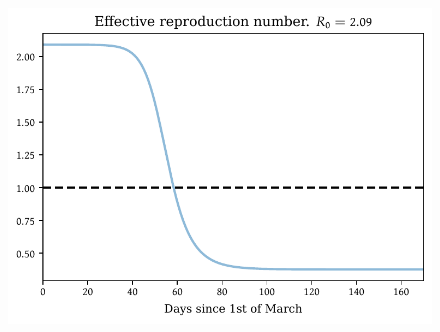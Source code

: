 \documentclass[a4paper,11pt]{article}
\theoremstyle{definition}
\theoremstyle{plain}
\newlength{\twosubht}
\begin{document}
\begin{figure}[htbp]
{{    \includegraphics[height=15cm]{sir_example_files/sir_example_20_0.pdf}
  }%
}
\setlength{\twosubht}{\ht\twosubbox}


\centering


\end{figure}
\end{document}
